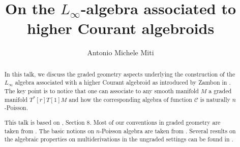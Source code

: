 \documentclass[10pt,a4paper]{article}
\title{On the $L_\infty$-algebra associated to higher Courant algebroids}
\author{Antonio Michele Miti}
\begin{document}
\maketitle

\begin{abstract}
In this talk, we  discuss the graded geometry aspects underlying the construction of the $L_\infty$ algebra associated with a higher Courant algebroid as introduced by Zambon in \cite{Zambon2012}.
The key point is to notice that one can associate to any smooth manifold $M$ a graded manifold $T^\ast[r]T[1]M$ and how the corresponding algebra of function $\mathcal{C}$ is naturally $n$-Poisson.

This talk is based on \cite{Zambon2012}, Section 8.
Most of our conventions in graded geometry are taken from \cite[\S 2]{Cattaneo2006} \cite[\S 2.4]{Schatz2009}.
The basic notions on $n$-Poisson algebra are taken from \cite{Cattaneo2006a}.
Several results on the algebraic properties on multiderivations in the ungraded settings can be found in \cite{Laurent-Gengoux2013}.
\end{abstract}



\cite{*}
			
			
\end{document}
